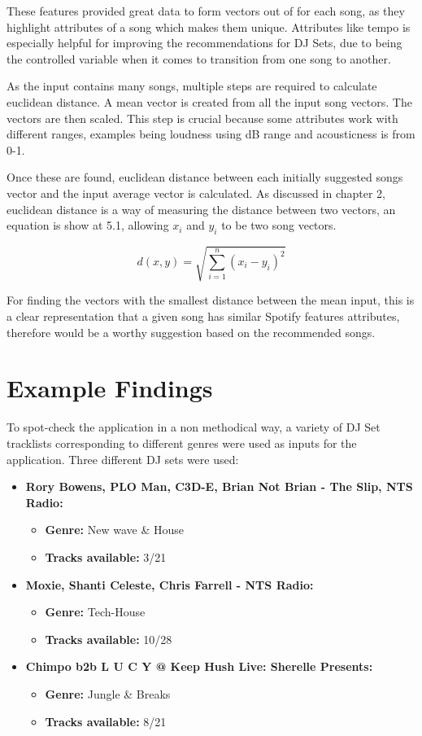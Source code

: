 These features provided great data to form vectors out of for each song, as they highlight attributes of a song which makes them unique. Attributes like tempo is especially helpful for improving the recommendations for DJ Sets, due to being the controlled variable when it comes to transition from one song to another.

As the input contains many songs, multiple steps are required to calculate euclidean distance. A mean vector is created from all the input song vectors. The vectors are then scaled. This step is crucial because some attributes work with different ranges, examples being loudness using dB range and acousticness is from 0-1.

Once these are found, euclidean distance between each initially suggested songs vector and the input average vector is calculated. As discussed in chapter 2, euclidean distance is a way of measuring the distance between two vectors, an equation is show at 5.1, allowing $x_{i}$ and $y_{i}$ to be two song vectors.

\begin{equation}
	d(x,y) = \sqrt{\sum _{i=1} ^{n}(x_{i} - y_{i})^{2}}
\end{equation}

For finding the vectors with the smallest distance between the mean input, this is a clear representation that a given song has similar Spotify features attributes, therefore would be a worthy suggestion based on the recommended songs.

\section{Example Findings}
To spot-check the application in a non methodical way, a variety of DJ Set tracklists corresponding to different genres were used as inputs for the application.  Three different DJ sets were used:

\begin{itemize}
	\item \textbf{Rory Bowens, PLO Man, C3D-E, Brian Not Brian - The Slip, NTS Radio: } 
	\begin{itemize}
		\item \textbf{Genre:} New wave \& House
		\item \textbf{Tracks available:} 3/21
	\end{itemize}
	\item \textbf{Moxie, Shanti Celeste, Chris Farrell - NTS Radio: } 
	\begin{itemize}
		\item \textbf{Genre:} Tech-House
		\item \textbf{Tracks available:} 10/28
	\end{itemize}
	\item \textbf{Chimpo b2b L U C Y @ Keep Hush Live: Sherelle Presents:}
	\begin{itemize}
		\item \textbf{Genre:} Jungle \& Breaks
		\item \textbf{Tracks available:} 8/21
	\end{itemize}
	
\end{itemize}


